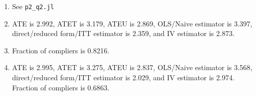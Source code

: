 \documentclass{article}
\begin{document}
\begin{enumerate}

\item See \texttt{p2\_q2.jl}

\item ATE is 2.992, ATET is 3.179, ATEU is 2.869, OLS/Naive estimator is 3.397, direct/reduced form/ITT estimator is 2.359, and IV estimator is 2.873.

\item Fraction of compliers is 0.8216.

\item  ATE is 2.995, ATET is 3.275, ATEU is 2.837, OLS/Naive estimator is 3.568, direct/reduced form/ITT estimator is 2.029, and IV estimator is 2.974. Fraction of compliers is 0.6863.

\end{enumerate}
\end{document}
